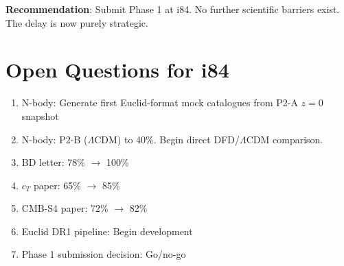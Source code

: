 \documentclass[11pt,a4paper]{article}
\begin{document}
\textbf{Recommendation}: Submit Phase 1 at i84. No further scientific barriers exist. The delay is now purely strategic.

\section{Open Questions for i84}

\begin{enumerate}[nosep]
\item N-body: Generate first Euclid-format mock catalogues from P2-A $z = 0$ snapshot
\item N-body: P2-B ($\Lambda$CDM) to 40\%. Begin direct DFD/$\Lambda$CDM comparison.
\item BD letter: 78\% $\to$ 100\%
\item $c_T$ paper: 65\% $\to$ 85\%
\item CMB-S4 paper: 72\% $\to$ 82\%
\item Euclid DR1 pipeline: Begin development
\item Phase 1 submission decision: Go/no-go
\end{enumerate}
\end{document}
